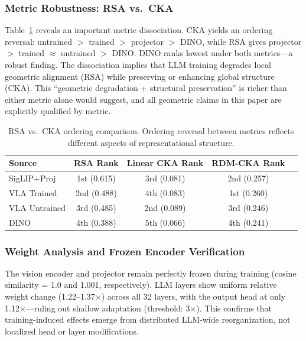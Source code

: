 \documentclass[letterpaper]{article}
\begin{document}
\subsubsection{Metric Robustness: RSA vs.\ CKA}
\label{sec:metric-robustness}

Table~\ref{tab:rsa-cka} reveals an important metric dissociation.
CKA yields an ordering reversal: untrained $>$ trained $>$ projector $>$ DINO, while RSA gives projector $>$ trained $\approx$ untrained $>$ DINO.
DINO ranks lowest under both metrics---a robust finding.
The dissociation implies that LLM training degrades local geometric alignment (RSA) while preserving or enhancing global structure (CKA).
This ``geometric degradation + structural preservation'' is richer than either metric alone would suggest, and all geometric claims in this paper are explicitly qualified by metric.

\begin{table}[t]
\centering
\caption{RSA vs.\ CKA ordering comparison. Ordering reversal between metrics reflects different aspects of representational structure.}
\label{tab:rsa-cka}
\small
\begin{tabular}{lcccc}
\toprule
Source & RSA Rank & Linear CKA Rank & RDM-CKA Rank \\
\midrule
SigLIP+Proj  & 1st (0.615) & 3rd (0.081) & 2nd (0.257) \\
VLA Trained   & 2nd (0.488) & 4th (0.083) & 1st (0.260) \\
VLA Untrained & 3rd (0.485) & 2nd (0.089) & 3rd (0.246) \\
DINO          & 4th (0.388) & 5th (0.066) & 4th (0.241) \\
\bottomrule
\end{tabular}
\end{table}

\subsubsection{Weight Analysis and Frozen Encoder Verification}
\label{sec:weight-analysis}

The vision encoder and projector remain perfectly frozen during training (cosine similarity = 1.0 and 1.001, respectively).
LLM layers show uniform relative weight change (1.22--1.37$\times$) across all 32 layers, with the output head at only 1.12$\times$---ruling out shallow adaptation (threshold: 3$\times$).
This confirms that training-induced effects emerge from distributed LLM-wide reorganization, not localized head or layer modifications.
\end{document}
